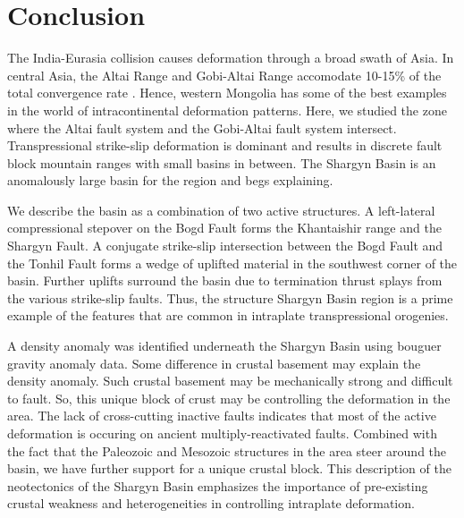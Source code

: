 \section{Conclusion}
	The India-Eurasia collision causes deformation through a broad swath of Asia. In central Asia, the Altai Range and Gobi-Altai Range accomodate 10-15\% of the total convergence rate \citep{Calais2003}. Hence, western Mongolia has some of the best examples in the world of intracontinental deformation patterns. Here, we studied the zone where the Altai fault system and the Gobi-Altai fault system intersect. Transpressional strike-slip deformation is dominant and results in discrete fault block mountain ranges with small basins in between. The Shargyn Basin is an anomalously large basin for the region and begs explaining. 

	We describe the basin as a combination of two active structures. A left-lateral compressional stepover on the Bogd Fault forms the Khantaishir range and the Shargyn Fault. A conjugate strike-slip intersection between the Bogd Fault and the Tonhil Fault forms a wedge of uplifted material in the southwest corner of the basin. Further uplifts surround the basin due to termination thrust splays from the various strike-slip faults. Thus, the structure Shargyn Basin region is a prime example of the features that are common in intraplate transpressional orogenies.

	A density anomaly was identified underneath the Shargyn Basin using bouguer gravity anomaly data. Some difference in crustal basement may explain the density anomaly. Such crustal basement may be mechanically strong and difficult to fault. So, this unique block of crust may be controlling the deformation in the area. The lack of cross-cutting inactive faults indicates that most of the active deformation is occuring on ancient multiply-reactivated faults. Combined with the fact that the Paleozoic and Mesozoic structures in the area steer around the basin, we have further support for a unique crustal block. This description of the neotectonics of the Shargyn Basin emphasizes the importance of pre-existing crustal weakness and heterogeneities in controlling intraplate deformation.


